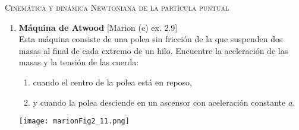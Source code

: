 \documentclass[11pt, spanish, a4paper, twoside]{article}
\begin{document}
\begin{center}
  \textsc{\large Cinemática y dinámica Newtoniana de la partícula puntual}
\end{center}

\begin{enumerate}


\section*{Ecuaciones de la dinámica - 2"a ley de Newton}




%
%



\section*{Condiciones de vínculo}
\item
\begin{minipage}[t][5cm]{0.4\textwidth}
\textbf{Máquina de Atwood} [Marion (e) ex. 2.9]\\
Esta máquina consiste de una polea sin fricción de la que suspenden dos masas al final de cada extremo de un hilo.
Encuentre la aceleración de las masas y la tensión de las cuerda:
  \begin{enumerate}
	\item cuando el centro de la polea está en reposo,
	\item y cuando la polea desciende en un ascensor con aceleración constante \(a\).
  \end{enumerate}
\end{minipage}
\begin{minipage}[c][1cm][t]{0.55\textwidth}
	\texttt{[image: marionFig2\_11.png]}
\end{minipage}


\end{enumerate}
\end{document}
